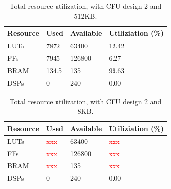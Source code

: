 \begin{table}[H]
\centering
\caption{Total resource utilization, with CFU design 2 and 512KB.}
\begin{tabular}{|l|l|l|l|}
\hline
Resource & Used & Available & Utiliziation (\%) \\ \hline
LUTs     & 7872 & 63400     & 12.42              \\ \hline
FFs      & 7945 & 126800    & 6.27              \\ \hline
BRAM     & 134.5    & 135       & 99.63              \\ \hline
DSPs     & 0    & 240       & 0.00              \\ \hline
\end{tabular}
\label{tab:}
\end{table}

\begin{table}[H]
\centering
\caption{Total resource utilization, with CFU design 2 and 8KB.}
\begin{tabular}{|l|l|l|l|}
\hline
Resource & Used & Available & Utiliziation (\%) \\ \hline
LUTs     & \textcolor{red}{xxx} & 63400     & \textcolor{red}{xxx}              \\ \hline
FFs      & \textcolor{red}{xxx} & 126800    & \textcolor{red}{xxx}              \\ \hline
BRAM     & \textcolor{red}{xxx}    & 135       & \textcolor{red}{xxx}              \\ \hline
DSPs     & 0    & 240       & 0.00              \\ \hline
\end{tabular}
\label{tab:}
\end{table}